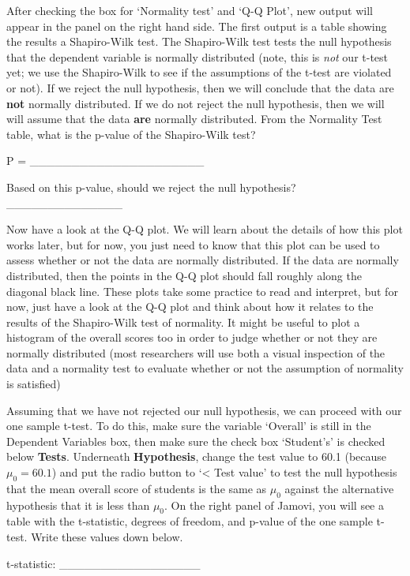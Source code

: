 \documentclass[
]{scrbook}
\begin{document}
After checking the box for `Normality test' and `Q-Q Plot', new output will appear in the panel on the right hand side.
The first output is a table showing the results a Shapiro-Wilk test.
The Shapiro-Wilk test tests the null hypothesis that the dependent variable is normally distributed (note, this is \emph{not} our t-test yet; we use the Shapiro-Wilk to see if the assumptions of the t-test are violated or not).
If we reject the null hypothesis, then we will conclude that the data are \textbf{not} normally distributed.
If we do not reject the null hypothesis, then we will will assume that the data \textbf{are} normally distributed.
From the Normality Test table, what is the p-value of the Shapiro-Wilk test?

P = \_\_\_\_\_\_\_\_\_\_\_\_\_\_\_\_\_\_\_\_\_

Based on this p-value, should we reject the null hypothesis? \_\_\_\_\_\_\_\_\_\_\_\_\_\_

Now have a look at the Q-Q plot.
We will learn about the details of how this plot works later, but for now, you just need to know that this plot can be used to assess whether or not the data are normally distributed.
If the data are normally distributed, then the points in the Q-Q plot should fall roughly along the diagonal black line.
These plots take some practice to read and interpret, but for now, just have a look at the Q-Q plot and think about how it relates to the results of the Shapiro-Wilk test of normality.
It might be useful to plot a histogram of the overall scores too in order to judge whether or not they are normally distributed (most researchers will use both a visual inspection of the data and a normality test to evaluate whether or not the assumption of normality is satisfied)

Assuming that we have not rejected our null hypothesis, we can proceed with our one sample t-test.
To do this, make sure the variable `Overall' is still in the Dependent Variables box, then make sure the check box `Student's' is checked below \textbf{Tests}.
Underneath \textbf{Hypothesis}, change the test value to 60.1 (because \(\mu_{0} = 60.1\)) and put the radio button to `\textless{} Test value' to test the null hypothesis that the mean overall score of students is the same as \(\mu_{0}\) against the alternative hypothesis that it is less than \(\mu_{0}\).
On the right panel of Jamovi, you will see a table with the t-statistic, degrees of freedom, and p-value of the one sample t-test.
Write these values down below.

t-statistic: \_\_\_\_\_\_\_\_\_\_\_\_\_\_\_\_\_
\end{document}
